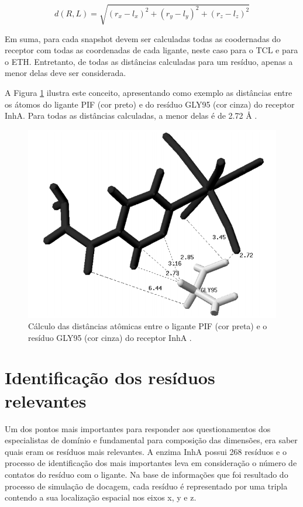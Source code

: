 \begin{equation}
\label{eqt:distEuclid}
	d(R,L)=\sqrt{(r_{x}-l_{x})^{2}+(r_{y}-l_{y})^{2}+(r_{z}-l_{z})^{2}}
\end{equation}

Em suma, para cada snapshot devem ser calculadas todas as coodernadas do receptor com todas as coordenadas de cada ligante, neste caso para o TCL e para o ETH. Entretanto, de todas as distâncias calculadas para um resíduo, apenas a menor delas deve ser considerada. 

A Figura \ref{fig:PIFvsGLY} ilustra este conceito, apresentando como exemplo as distâncias entre os átomos do ligante PIF (cor preto) e do resíduo GLY95 (cor cinza) do receptor InhA. Para todas as distâncias calculadas, a menor delas é de 2.72 {\AA} \cite{MAC10}.

\begin{figure}[h]
	\center
	\includegraphics[scale=0.5]{images/distEucli.png}
	\caption{Cálculo das distâncias atômicas entre o ligante PIF (cor preta) e o resíduo GLY95 (cor cinza) do receptor InhA \cite{MAC10}.}
	\label{fig:PIFvsGLY}
\end{figure} 

\section{Identificação dos resíduos relevantes}

Um dos pontos mais importantes para responder aos questionamentos dos especialistas de domínio e fundamental para composição das dimensões, era saber quais eram os resíduos mais relevantes. A enzima InhA possui 268 resíduos \cite{KARANADUNOSM09} e o processo de identificação dos mais importantes leva em consideração o número de contatos do resíduo com o ligante. Na base de informações que foi resultado do processo de simulação de docagem, cada resíduo é representado por uma tripla contendo a sua localização espacial nos eixos x, y e z.

